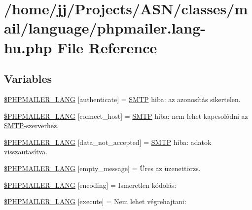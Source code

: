 \hypertarget{phpmailer_8lang-hu_8php}{}\section{/home/jj/\+Projects/\+A\+S\+N/classes/mail/language/phpmailer.lang-\/hu.php File Reference}
\label{phpmailer_8lang-hu_8php}
\subsection*{Variables}
\begin{DoxyCompactItemize}
\item 
\hyperlink{phpmailer_8lang-hu_8php_a2cb33073c989b85580748e331ed8b4aa}{\$\+P\+H\+P\+M\+A\+I\+L\+E\+R\+\_\+\+L\+A\+NG} \mbox{[}\textquotesingle{}authenticate\textquotesingle{}\mbox{]} = \textquotesingle{}\hyperlink{class_s_m_t_p}{S\+M\+TP} hiba\+: az azonosítás sikertelen.\textquotesingle{}
\item 
\hyperlink{phpmailer_8lang-hu_8php_a2ee0cc637a06b96e45600db31c6799ee}{\$\+P\+H\+P\+M\+A\+I\+L\+E\+R\+\_\+\+L\+A\+NG} \mbox{[}\textquotesingle{}connect\+\_\+host\textquotesingle{}\mbox{]} = \textquotesingle{}\hyperlink{class_s_m_t_p}{S\+M\+TP} hiba\+: nem lehet kapcsolódni az \hyperlink{class_s_m_t_p}{S\+M\+TP}-\/szerverhez.\textquotesingle{}
\item 
\hyperlink{phpmailer_8lang-hu_8php_a814c6b191205d2361b3233e9c9d6fda5}{\$\+P\+H\+P\+M\+A\+I\+L\+E\+R\+\_\+\+L\+A\+NG} \mbox{[}\textquotesingle{}data\+\_\+not\+\_\+accepted\textquotesingle{}\mbox{]} = \textquotesingle{}\hyperlink{class_s_m_t_p}{S\+M\+TP} hiba\+: adatok visszautasítva.\textquotesingle{}
\item 
\hyperlink{phpmailer_8lang-hu_8php_a33772099f637c9d6c2cd7425e0e37fed}{\$\+P\+H\+P\+M\+A\+I\+L\+E\+R\+\_\+\+L\+A\+NG} \mbox{[}\textquotesingle{}empty\+\_\+message\textquotesingle{}\mbox{]} = \textquotesingle{}Üres az üzenettörzs.\textquotesingle{}
\item 
\hyperlink{phpmailer_8lang-hu_8php_a817f7283f3d54c970a0c10305cc668cc}{\$\+P\+H\+P\+M\+A\+I\+L\+E\+R\+\_\+\+L\+A\+NG} \mbox{[}\textquotesingle{}encoding\textquotesingle{}\mbox{]} = \textquotesingle{}Ismeretlen kódolás\+: \textquotesingle{}
\item 
\hyperlink{phpmailer_8lang-hu_8php_a668217a9563a168f30f2a8548b6ed5a9}{\$\+P\+H\+P\+M\+A\+I\+L\+E\+R\+\_\+\+L\+A\+NG} \mbox{[}\textquotesingle{}execute\textquotesingle{}\mbox{]} = \textquotesingle{}Nem lehet végrehajtani\+: \textquotesingle{}

\end{DoxyCompactItemize}

